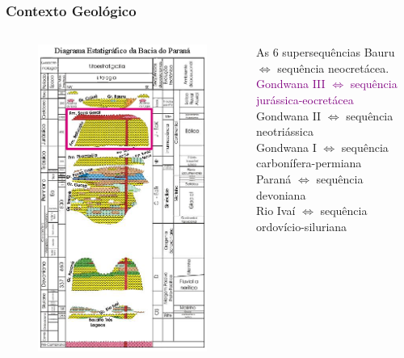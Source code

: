 \documentclass[aspectratio=10]{beamer} %
\begin{document}
\begin{frame}
\frametitle{Contexto Geológico}
\begin{columns}
\begin{column}{0.4\textwidth}
\begin{figure}
\includegraphics[scale=0.36]{Imagens/diagramagondwanaiii.png}
\end{figure}
\end{column}
\begin{column}{0.75\textwidth}
\begin{block}{As $6$ supersequências}
Bauru $\Longleftrightarrow$  sequência neocretácea.\\
\textcolor{purple}{Gondwana III $\Longleftrightarrow$ sequência jurássica-eocretácea}\\
Gondwana II $\Longleftrightarrow$ sequência neotriássica \\
Gondwana I $\Longleftrightarrow$ sequência carbonífera-permiana\\ 
Paraná $\Longleftrightarrow$ sequência devoniana\\
Rio Ivaí $\Longleftrightarrow$ sequência ordovício-siluriana\\
\cite{Vail_1977,assine_1994,milani_orogenias_1998}
\end{block}
\end{column}
\end{columns}
\end{frame}
\end{document}
